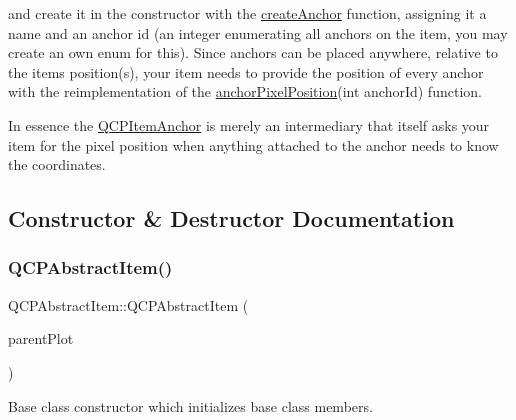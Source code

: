 \begin{DoxyCode}{0}
\end{DoxyCode}


and create it in the constructor with the \mbox{\hyperlink{class_q_c_p_abstract_item_af3fc92527802078ca395138748b629a7}{create\+Anchor}} function, assigning it a name and an anchor id (an integer enumerating all anchors on the item, you may create an own enum for this). Since anchors can be placed anywhere, relative to the item\textquotesingle{}s position(s), your item needs to provide the position of every anchor with the reimplementation of the \mbox{\hyperlink{class_q_c_p_abstract_item_ada5bad4e1196c4fc0d0d12328e24b8f2}{anchor\+Pixel\+Position}}(int anchor\+Id) function.

In essence the \mbox{\hyperlink{class_q_c_p_item_anchor}{Q\+C\+P\+Item\+Anchor}} is merely an intermediary that itself asks your item for the pixel position when anything attached to the anchor needs to know the coordinates. 

\subsection{Constructor \& Destructor Documentation}
\mbox{\label{class_q_c_p_abstract_item_a9922507d8b4503a1fe1ed0b1030e23b6}} 
\subsubsection{\texorpdfstring{QCPAbstractItem()}{QCPAbstractItem()}}
{\footnotesize\ttfamily Q\+C\+P\+Abstract\+Item\+::\+Q\+C\+P\+Abstract\+Item (\begin{DoxyParamCaption}\item[{\mbox{\hyperlink{class_q_custom_plot}{Q\+Custom\+Plot}} $\ast$}]{parent\+Plot }\end{DoxyParamCaption})\hspace{0.3cm}{\ttfamily [explicit]}}

Base class constructor which initializes base class members. \mbox{\label{class_q_c_p_abstract_item_a375bd1b7d3218b04a6ff7ff06fff917c}} 
